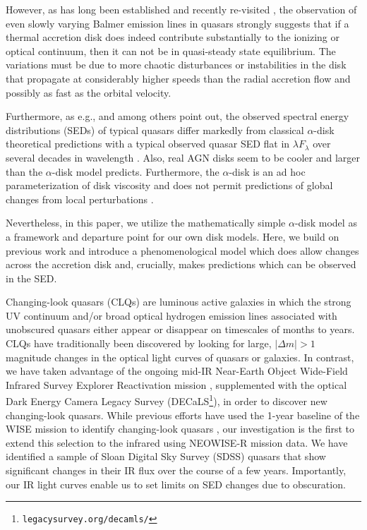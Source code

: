 \documentclass[a4paper,fleqn,usenatbib]{mnras}
\begin{document}
However, as has long been established \citep[e.g., ][]{Alloin1985} and
recently re-visited \citep[e.g., ][]{LaMassa2015, Runnoe2016,
MacLeod2016, Ruan2016, Rumbaugh2017, Yang2017, Lawrence2018}, the
observation of even slowly varying Balmer emission lines in quasars
strongly suggests that if a thermal accretion disk does indeed
contribute substantially to the ionizing or optical continuum, then it
can not be in quasi-steady state equilibrium. The variations must be
due to more chaotic disturbances or instabilities in the disk that
propagate at considerably higher speeds than the radial accretion flow
and possibly as fast as the orbital velocity.

Furthermore, as e.g., \citet{Koratkar_Blaes1999} and
\citet{Sirko_Goodman2003} among others point out, the observed
spectral energy distributions (SEDs) of typical quasars differ
markedly from classical $\alpha$-disk theoretical predictions
\citep[][]{SS73, Pringle1981} with a typical observed quasar SED flat
in $\lambda F_{\lambda}$ over several decades in wavelength
\citep{Elvis1994, Richards2006b}. Also, real AGN disks seem to be
cooler \citep[e.g., ][]{Lawrence2012} and larger
\citep[e.g.,][]{Pooley2007, Morgan2010, Morgan2012, Mosquera2011} than
the $\alpha$-disk model predicts. Furthermore, the $\alpha$-disk is an
ad hoc parameterization of disk viscosity and does not permit
predictions of global changes from local perturbations
\citep{King2012}.

Nevertheless, in this paper, we utilize the mathematically simple
$\alpha$-disk model as a framework and departure point for our own
disk models. Here, we build on previous work \citep{Sirko_Goodman2003,
Zimmerman2005, Hameury2009} and introduce a phenomenological model
which does allow changes across the accretion disk and, crucially,
makes predictions which can be observed in the SED.

Changing-look quasars (CLQs) are luminous active galaxies in which the
strong UV continuum and/or broad optical hydrogen emission lines
associated with unobscured quasars either appear or disappear on
timescales of months to years. CLQs have traditionally been discovered
by looking for large, $| \Delta m | >1$ magnitude changes in the
optical light curves of quasars or galaxies. In contrast, we have
taken advantage of the ongoing mid-IR Near-Earth Object Wide-Field
Infrared Survey Explorer Reactivation mission \citep[NEOWISE-R;
][]{Mainzer2014}, supplemented with the optical Dark Energy Camera
Legacy Survey (DECaLS\footnote{{\tt legacysurvey.org/decamls/}}), in
order to discover new changing-look quasars.  While previous efforts
have used the 1-year baseline of the WISE mission to identify
changing-look quasars \citep[e.g.,][]{Assef2018, Stern2018}, our
investigation is the first to extend this selection to the infrared
using NEOWISE-R mission data. We have identified a sample of Sloan
Digital Sky Survey (SDSS) quasars that show significant changes in
their IR flux over the course of a few years. Importantly, our IR
light curves enable us to set limits on SED changes due to
obscuration.
\end{document}
